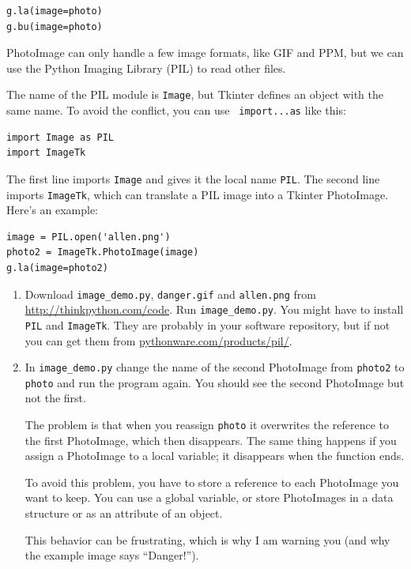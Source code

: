 \documentclass[10pt]{book}
\begin{document}
\begin{CJK}{UTF8}{gbsn}
\begin{exercise}
\begin{verbatim}
g.la(image=photo)
g.bu(image=photo)
\end{verbatim}
%
PhotoImage can only handle a few image formats, like GIF and PPM, 
but we can use the Python Imaging Library (PIL) to read other
files.

The name of the PIL module is {\tt Image}, but Tkinter defines an
object with the same name.  To avoid the conflict, you can use {\tt
  import...as} like this:

\begin{verbatim}
import Image as PIL
import ImageTk
\end{verbatim}
%
The first line imports {\tt Image} and
gives it the local name {\tt PIL}.  The second
line imports {\tt ImageTk}, which can translate a PIL
image into a Tkinter PhotoImage.  Here's an example:

\begin{verbatim}
image = PIL.open('allen.png')
photo2 = ImageTk.PhotoImage(image)
g.la(image=photo2)
\end{verbatim}
%

\begin{enumerate}

\item Download \verb"image_demo.py", \verb"danger.gif" and \verb"allen.png"
from \url{http://thinkpython.com/code}.  Run \verb"image_demo.py".  You
might have to install {\tt PIL} and {\tt ImageTk}.  
They are probably in your software repository,  but if not
you can get them from \url{pythonware.com/products/pil/}.

\item In \verb"image_demo.py" change the name of the second
PhotoImage from {\tt photo2} to {\tt photo} and run the program
again.  You should see the second PhotoImage but not the first.

The problem is that when you reassign {\tt photo} it overwrites
the reference to the first PhotoImage, which then disappears.  The
same thing happens if you assign a PhotoImage to a local
variable; it disappears when the function ends.

To avoid this problem, you have to store a reference to each
PhotoImage you want to keep.  You can use a global variable, or
store PhotoImages in a data structure or as an attribute of
an object.

This behavior can be frustrating, which is why I am warning
you (and why the example image says ``Danger!'').


\end{enumerate}
\end{exercise}
\end{CJK}
\end{document}
